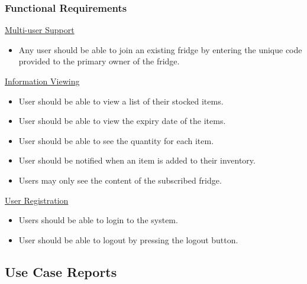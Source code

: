 \documentclass[a4paper, 11pt]{article}
\begin{document}
\subsubsection{Functional Requirements}
\underline{Multi-user Support}
\begin{itemize}
  \item Any user should be able to join an existing fridge by entering the unique code provided to the primary owner of the fridge.
\end{itemize}
\underline{Information Viewing}
\begin{itemize}
  \item User should be able to view a list of their stocked items.
  \item User should be able to view the expiry date of the items. 
  \item User should be able to see the quantity for each item.
  \item User should be notified when an item is added to their inventory.
  \item Users may only see the content of the subscribed fridge.
\end{itemize}
\underline{User Registration}
\begin{itemize}
  \item Users should be able to login to the system. 
  \item User should be able to logout by pressing the logout button.
\end{itemize}

\vspace{\baselineskip}
\vspace{\baselineskip}

\subsection{Use Case Reports}
\end{document}
